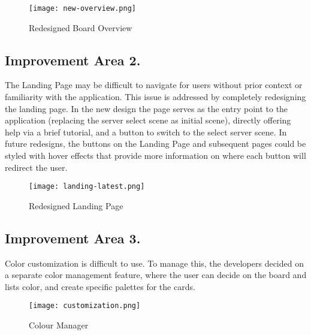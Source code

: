 \begin{figure}[H]
    \centering
    \texttt{[image: new-overview.png]}
    \caption{Redesigned Board Overview}
    \label{fig:overview-redesign}
\end{figure}


\subsection*{Improvement Area 2.}
\indent The Landing Page may be difficult to navigate for users without prior context or familiarity with the application.
\newline
\indent
This issue is addressed by completely redesigning the landing page. In the new design the page serves as the entry point to the application (replacing the server select scene as initial scene), directly offering help via a brief tutorial, and a button to switch to the select server scene. In future redesigns, the buttons on the Landing Page and subsequent pages could be styled with hover effects that provide more information on where each button will redirect the user.

\begin{figure}[H]
    \centering
    \texttt{[image: landing-latest.png]}
    \caption{Redesigned Landing Page}
    \label{fig:landing-redesign}
\end{figure}


\subsection*{Improvement Area 3.}
\indent Color customization is difficult to use. \newline\indent
To manage this, the developers decided on a separate
color management feature, where the user can decide on the board and lists color, and create specific palettes for the cards.

\begin{figure}[H]
    \centering
    \texttt{[image: customization.png]}
    \caption{Colour Manager}
    \label{fig:colour-redesign}
\end{figure}


